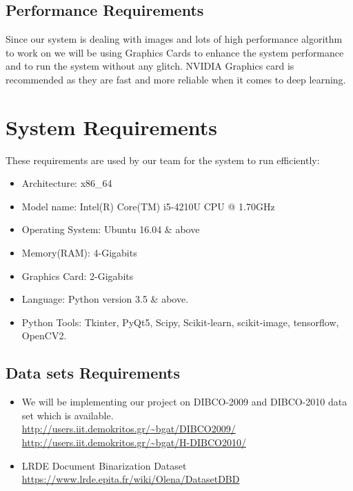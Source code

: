\documentclass[oneside,a4paper,12pt]{report}
\begin{document}
\subsection{Performance Requirements}
Since our system is dealing with images and lots of high performance algorithm to work on we will be using Graphics Cards to enhance the system performance and to run the system without any glitch. NVIDIA Graphics card is recommended as they are fast and more reliable when it comes to deep learning.

\section{System Requirements}
These requirements are used by our team for the system to run efficiently:
\begin{itemize}
    \item Architecture:        x86\_64
    \item Model name:          Intel(R) Core(TM) i5-4210U CPU @ 1.70GHz
    \item Operating System:    Ubuntu 16.04 \& above
    \item Memory(RAM):         4-Gigabits
    \item Graphics Card:       2-Gigabits
    \item Language:            Python version 3.5 \& above.
    \item Python Tools:        Tkinter, PyQt5, Scipy, Scikit-learn, scikit-image, tensorflow, OpenCV2.
\end{itemize}
\subsection{Data sets Requirements}
\begin{itemize}
    \item We will be implementing our project on DIBCO-2009 and DIBCO-2010 data set which is available.\\
\url{http://users.iit.demokritos.gr/~bgat/DIBCO2009/}\\
\url{http://users.iit.demokritos.gr/~bgat/H-DIBCO2010/}

\item LRDE Document Binarization Dataset\\
\url{https://www.lrde.epita.fr/wiki/Olena/DatasetDBD}

\end{itemize}
\end{document}
